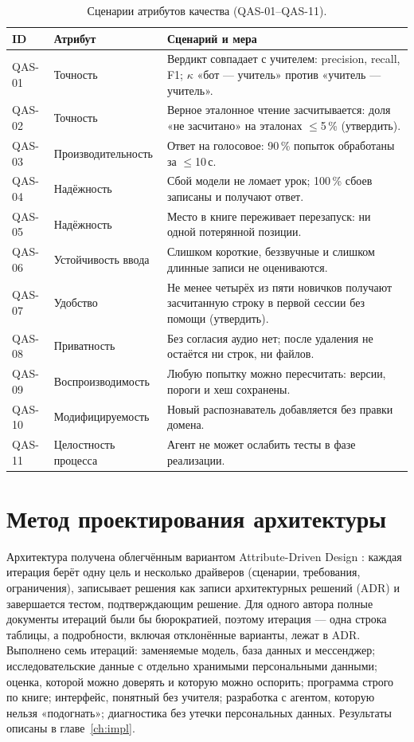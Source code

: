 \begin{table}[ht]
\centering\small
\caption{Сценарии атрибутов качества (QAS-01--QAS-11).}
\label{tab:qas}
\begin{tabularx}{\linewidth}{@{}lP{3.8cm}L@{}}
\toprule
ID & Атрибут & Сценарий и мера \\
\midrule
QAS-01 & Точность & Вердикт совпадает с учителем: precision, recall, F1; $\kappa$ «бот --- учитель» против
«учитель --- учитель». \\
QAS-02 & Точность & Верное эталонное чтение засчитывается: доля «не засчитано» на эталонах
$\le$5\,\% (утвердить). \\
QAS-03 & Производительность & Ответ на голосовое: 90\,\% попыток обработаны за $\le$10\,с. \\
QAS-04 & Надёжность & Сбой модели не ломает урок; 100\,\% сбоев записаны и получают ответ. \\
QAS-05 & Надёжность & Место в книге переживает перезапуск: ни одной потерянной позиции. \\
QAS-06 & Устойчивость ввода & Слишком короткие, беззвучные и слишком длинные записи не оцениваются. \\
QAS-07 & Удобство & Не менее четырёх из пяти новичков получают засчитанную строку в первой сессии без
помощи (утвердить). \\
QAS-08 & Приватность & Без согласия аудио нет; после удаления не остаётся ни строк, ни файлов. \\
QAS-09 & Воспроизводимость & Любую попытку можно пересчитать: версии, пороги и хеш сохранены. \\
QAS-10 & Модифицируемость & Новый распознаватель добавляется без правки домена. \\
QAS-11 & Целостность процесса & Агент не может ослабить тесты в фазе реализации. \\
\bottomrule
\end{tabularx}
\end{table}

\section{Метод проектирования архитектуры}\label{sec:method-add}

Архитектура получена облегчённым вариантом Attribute-Driven Design \cite{SRC-047}: каждая итерация берёт
одну цель и несколько драйверов (сценарии, требования, ограничения), записывает решения как записи
архитектурных решений (ADR) \cite{SRC-010} и завершается тестом, подтверждающим решение. Для одного автора
полные документы итераций были бы бюрократией, поэтому итерация --- одна строка таблицы, а подробности,
включая отклонённые варианты, лежат в ADR. Выполнено семь итераций: заменяемые модель, база данных и
мессенджер; исследовательские данные с отдельно хранимыми персональными данными; оценка, которой можно
доверять и которую можно оспорить; программа строго по книге; интерфейс, понятный без учителя;
разработка с агентом, которую нельзя «подогнать»; диагностика без утечки персональных данных. Результаты
описаны в главе~\ref{ch:impl}.

